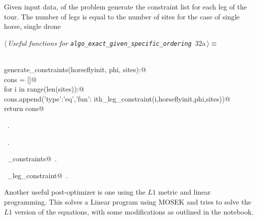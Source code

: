 \documentclass[11.5pt]{report}
\begin{document}
\vspace{-0.8cm} \newchunk Given input data, of the problem generate the constraint list for each leg 
of the tour. The number of legs is equal to the number of sites for the case of single horse, single drone
\begin{flushleft} \small\label{scrap44}\raggedright\small
{} $\langle\,${\itshape Useful functions for \verb|algo_exact_given_specific_ordering|}\nobreak\ {\footnotesize {32a}}$\,\rangle\equiv$
\vspace{-1ex}
\begin{list}{}{} \item
\mbox{}\verb@@\\
\mbox{}\verb@def generate_constraints(horseflyinit, phi, sites):@\\
\mbox{}\verb@   cons = []@\\
\mbox{}\verb@   for i in range(len(sites)):@\\
\mbox{}\verb@        cons.append({'type':'eq','fun': ith_leg_constraint(i,horseflyinit,phi,sites)})@\\
\mbox{}\verb@   return cons@\\
\mbox{}\verb@@{\NWsep}
\end{list}
\vspace{-1.5ex}
\footnotesize
\begin{list}{}{\setlength{\itemsep}{-\parsep}\setlength{\itemindent}{-\leftmargin}}
\item \NWtxtMacroDefBy\ .
\item \NWtxtMacroRefIn\ .
\item \NWtxtIdentsDefed\nobreak\  \verb@generate_constraints@\nobreak\ .\item \NWtxtIdentsUsed\nobreak\  \verb@ith_leg_constraint@\nobreak\ .
\item{}
\end{list}
\vspace{4ex}
\end{flushleft}




\vspace{-0.8cm} \newchunk Another useful post-optimizer is one using the $L1$ metric and linear programming. 
This solves a Linear program using MOSEK and tries to solve the 
$L1$ version of the equations, with some modifications as outlined
    in the notebook.
\end{document}
